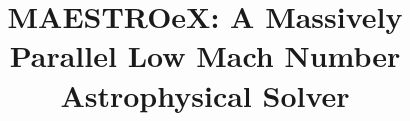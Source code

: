 \documentclass{aastex62}
\begin{document}
\title{MAESTROeX: A Massively Parallel Low Mach Number Astrophysical Solver}


\end{document}
